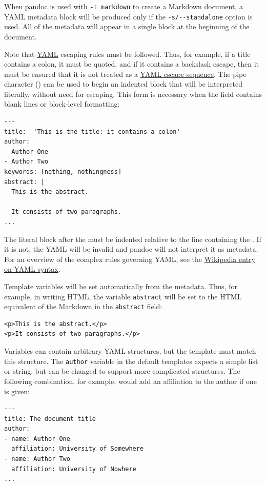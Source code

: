 \documentclass[
  b5paper
]{book}
\begin{document}
When pandoc is used with \texttt{-t\ markdown} to create a Markdown
document, a YAML metadata block will be produced only if the
\texttt{-s/-\/-standalone} option is used. All of the metadata will
appear in a single block at the beginning of the document.

Note that \href{https://yaml.org/spec/1.2/spec.html}{YAML} escaping
rules must be followed. Thus, for example, if a title contains a colon,
it must be quoted, and if it contains a backslash escape, then it must
be ensured that it is not treated as a
\href{https://yaml.org/spec/1.2/spec.html\#id2776092}{YAML escape
sequence}. The pipe character (\texttt{\textbar{}}) can be used to begin
an indented block that will be interpreted literally, without need for
escaping. This form is necessary when the field contains blank lines or
block-level formatting:

\begin{verbatim}
---
title:  'This is the title: it contains a colon'
author:
- Author One
- Author Two
keywords: [nothing, nothingness]
abstract: |
  This is the abstract.

  It consists of two paragraphs.
...
\end{verbatim}

The literal block after the \texttt{\textbar{}} must be indented
relative to the line containing the \texttt{\textbar{}}. If it is not,
the YAML will be invalid and pandoc will not interpret it as metadata.
For an overview of the complex rules governing YAML, see the
\href{https://en.wikipedia.org/wiki/YAML\#Syntax}{Wikipedia entry on
YAML syntax}.

Template variables will be set automatically from the metadata. Thus,
for example, in writing HTML, the variable \texttt{abstract} will be set
to the HTML equivalent of the Markdown in the \texttt{abstract} field:

\begin{verbatim}
<p>This is the abstract.</p>
<p>It consists of two paragraphs.</p>
\end{verbatim}

Variables can contain arbitrary YAML structures, but the template must
match this structure. The \texttt{author} variable in the default
templates expects a simple list or string, but can be changed to support
more complicated structures. The following combination, for example,
would add an affiliation to the author if one is given:

\begin{verbatim}
---
title: The document title
author:
- name: Author One
  affiliation: University of Somewhere
- name: Author Two
  affiliation: University of Nowhere
...
\end{verbatim}
\end{document}
